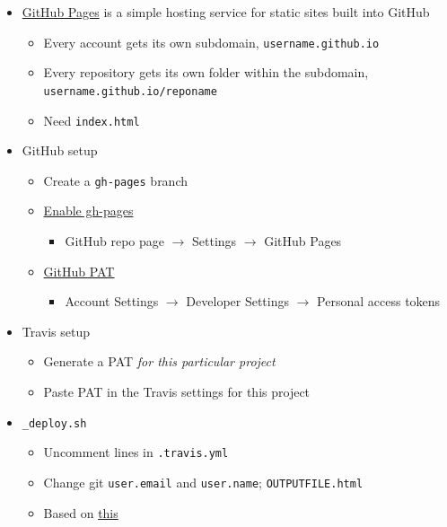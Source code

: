 \documentclass[
]{article}
\providecommand{\tightlist}{%
  \setlength{\itemsep}{0pt}\setlength{\parskip}{0pt}}
\begin{document}
\begin{itemize}
\tightlist
\item
  \href{https://docs.github.com/en/free-pro-team@latest/github/working-with-github-pages}{GitHub Pages} is a simple hosting service for static sites built into GitHub

  \begin{itemize}
  \tightlist
  \item
    Every account gets its own subdomain, \texttt{username.github.io}
  \item
    Every repository gets its own folder within the subdomain, \texttt{username.github.io/reponame}
  \item
    Need \texttt{index.html}
  \end{itemize}
\item
  GitHub setup

  \begin{itemize}
  \tightlist
  \item
    Create a \texttt{gh-pages} branch
  \item
    \href{https://guides.GitHub.com/features/pages/}{Enable gh-pages}

    \begin{itemize}
    \tightlist
    \item
      GitHub repo page \(\to\) Settings \(\to\) GitHub Pages
    \end{itemize}
  \item
    \href{https://docs.github.com/en/free-pro-team@latest/github/authenticating-to-github/creating-a-personal-access-token}{GitHub PAT}

    \begin{itemize}
    \tightlist
    \item
      Account Settings \(\to\) Developer Settings \(\to\) Personal access tokens
    \end{itemize}
  \end{itemize}
\item
  Travis setup

  \begin{itemize}
  \tightlist
  \item
    Generate a PAT \emph{for this particular project}
  \item
    Paste PAT in the Travis settings for this project
  \end{itemize}
\item
  \texttt{\_deploy.sh}

  \begin{itemize}
  \tightlist
  \item
    Uncomment lines in \texttt{.travis.yml}
  \item
    Change git \texttt{user.email} and \texttt{user.name}; \texttt{OUTPUTFILE.html}
  \item
    Based on \href{https://bookdown.org/yihui/bookdown/github.html}{this}
  \end{itemize}
\end{itemize}
\end{document}
